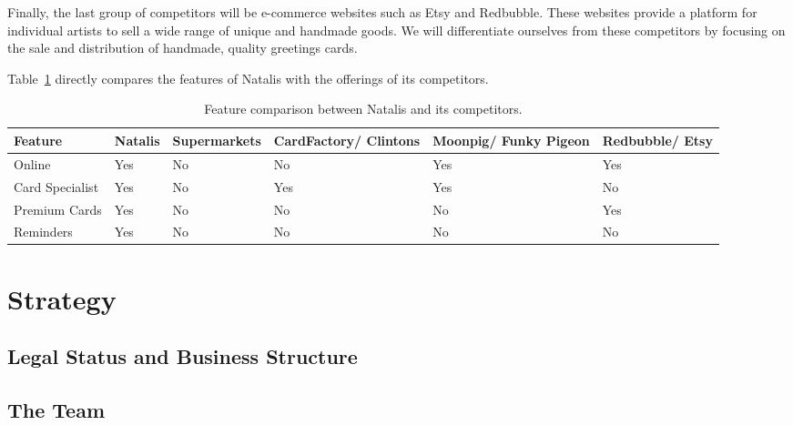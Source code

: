 \documentclass[10pt,a4paper]{article}
\begin{document}
Finally, the last group of competitors will be e-commerce websites such as Etsy and Redbubble. These websites provide a platform for individual artists to sell a wide range of unique and handmade goods. We will differentiate ourselves from these competitors by focusing on the sale and distribution of handmade, quality greetings cards.

Table~\ref{table:competitor_analysis} directly compares the features of Natalis with the offerings of its competitors.

\begin{table}[h]\footnotesize\centering
 \begin{tabular}{ | p{2cm} | p{2cm} | p{2cm} | p{2cm} | p{2cm} | p{2cm} | }
    \hline
    Feature & Natalis & Supermarkets & CardFactory/ Clintons & Moonpig/ Funky Pigeon & Redbubble/ Etsy \\
    \hline
    Online & \cellcolor{tableGreen}Yes & \cellcolor{tableRed}No & \cellcolor{tableRed}No & \cellcolor{tableGreen}Yes & \cellcolor{tableGreen}Yes \\
    Card Specialist & \cellcolor{tableGreen}Yes & \cellcolor{tableRed}No & \cellcolor{tableGreen}Yes & \cellcolor{tableGreen}Yes & \cellcolor{tableRed}No \\
    Premium Cards& \cellcolor{tableGreen}Yes & \cellcolor{tableRed}No & \cellcolor{tableRed}No & \cellcolor{tableRed}No & \cellcolor{tableGreen}Yes \\
    Reminders & \cellcolor{tableGreen}Yes	& \cellcolor{tableRed}No & \cellcolor{tableRed}No & \cellcolor{tableRed}No & \cellcolor{tableRed}No \\
    \hline
  \end{tabular}
  \caption{Feature comparison between Natalis and its competitors.}
	\label{table:competitor_analysis}
\end{table}

\section*{Strategy}
\subsection*{Legal Status and Business Structure}

\subsection*{The Team}
\end{document}
